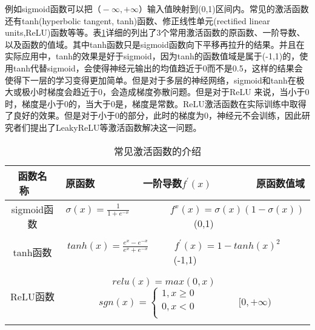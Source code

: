 例如sigmoid函数可以把$（-\infty,+\infty）$输入值映射到(0,1)区间内。常见的激活函数还有tanh(hyperbolic tangent, tanh)函数、修正线性单元(rectified linear units,ReLU)函数等等。表\ref{tab:activate-func}详细的列出了3个常用激活函数的原函数、一阶导数、以及函数的值域。其中tanh函数只是sigmoid函数向下平移再拉升的结果。并且在实际应用中，tanh的效果是好于sigmoid，因为tanh的函数值域是属于(-1,1)的，使用tanh代替sigmoid，会使得神经元输出的均值趋近于0而不是0.5，这样的结果会使得下一层的学习变得更加简单。但是对于多层的神经网络，sigmoid和tanh在极大或极小时梯度会趋近于0，会造成梯度弥散问题。但是对于ReLU 来说，当小于0时，梯度是小于0的，当大于0是，梯度是常数。ReLU激活函数在实际训练中取得了良好的效果。但是对于小于0的部分，此时的梯度为0，神经元不会训练，因此研究者们提出了LeakyReLU等激活函数解决这一问题。
\begin{table}[htpb]
  \centering
  \caption{常见激活函数的介绍}
  \label{tab:activate-func}
  \begin{tabular}{c|c}
    \toprule
    函数名称~~~ & 原函数 ~~~~~~~~一阶导数$f^{'}(x)$~~~~~~~~原函数值域 \\
    \midrule
    sigmoid函数 & $\sigma(x) = \frac{1}{1+e^{-x}}$ ~~~~~~~ $f^{x}(x)=\sigma(x)(1-\sigma(x))$ ~~~~~~~ (0,1) \\ \\
    tanh函数 & $tanh(x) = \frac{e^x-e^{-x}}{e^x+e^{-x}}$ ~~~~ $f^{'}(x)=1-tanh(x)^{2}$ ~~~~ (-1,1) \\ \\
    ReLU函数 & $relu(x) = max(0,x)$ ~~~~~~~~  $sgn(x)=\left\{ \begin{aligned} 1, x\geq 0 \\ 0, x<0 \\ \end{aligned} \right.$ ~~~~~~~ $ [0,+\infty)$ \\ \\
    \bottomrule
  \end{tabular}
\end{table}

